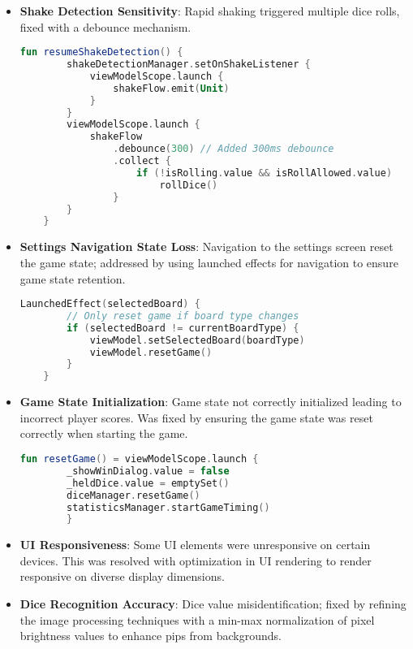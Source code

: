 \begin{itemize}

    \item \textbf{Shake Detection Sensitivity}: Rapid shaking triggered multiple dice rolls, fixed with a debounce mechanism.
        \begin{lstlisting}[language=Kotlin, caption=Fix for Shake Detection Sensitivity, label=lst:shake_detection_fix_code]
    fun resumeShakeDetection() {
        shakeDetectionManager.setOnShakeListener {
            viewModelScope.launch {
                shakeFlow.emit(Unit)
            }
        }
        viewModelScope.launch {
            shakeFlow
                .debounce(300) // Added 300ms debounce
                .collect {
                    if (!isRolling.value && isRollAllowed.value) 
                        rollDice()
                }
        }
    } 
    \end{lstlisting}
    \label{lst:shake_detection_fix_code}

    \item \textbf{Settings Navigation State Loss}: Navigation to the settings screen reset the game state; addressed by using launched effects for navigation to ensure game state retention.
        \begin{lstlisting}[language=Kotlin, caption=Fix for Settings Navigation State Loss, label=lst:setting_navigation_fix_code]
    LaunchedEffect(selectedBoard) {
        // Only reset game if board type changes
        if (selectedBoard != currentBoardType) {
            viewModel.setSelectedBoard(boardType)
            viewModel.resetGame()
        }
    } 
    \end{lstlisting}
     \label{lst:setting_navigation_fix_code}
   

    \item \textbf{Game State Initialization}: Game state not correctly initialized leading to incorrect player scores. Was fixed by ensuring the game state was reset correctly when starting the game.
    \begin{lstlisting}[language=Kotlin, caption=Fix for Game State Initialization, label=lst:game_state_reset]
        fun resetGame() = viewModelScope.launch {
        _showWinDialog.value = false
        _heldDice.value = emptySet()
        diceManager.resetGame()
        statisticsManager.startGameTiming()
        } 
    \end{lstlisting}
    \label{lst:game_state_reset}
    \item \textbf{UI Responsiveness}: Some UI elements were unresponsive on certain devices. This was resolved with optimization in UI rendering to render responsive on diverse display dimensions.
   
    \item \textbf{Dice Recognition Accuracy}: Dice value misidentification; fixed by refining the image processing techniques with a min-max normalization of pixel brightness values to enhance pips from backgrounds.
\end{itemize}

